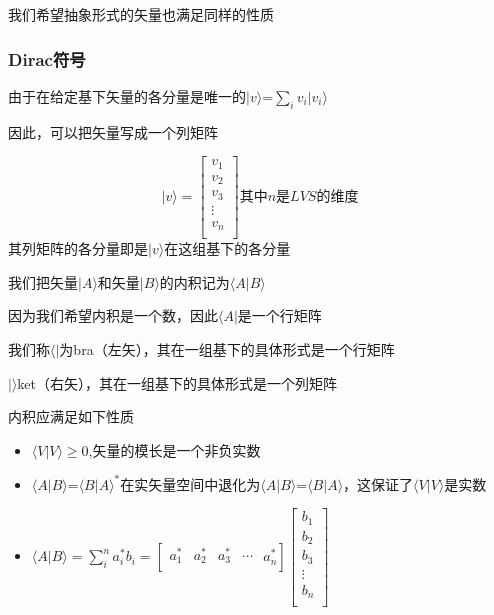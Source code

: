 \documentclass[lang=cn,10pt]{elegantbook}
\begin{document}
我们希望抽象形式的矢量也满足同样的性质

\subsubsection{Dirac符号}
由于在给定基下矢量的各分量是唯一的$|v\rangle$=$\sum_{i}v_i|v_i\rangle$

因此，可以把矢量写成一个列矩阵

\begin{equation}
	|v\rangle =\left[ \begin{array}{c}
		v_1\\
		v_2\\
		v_3\\
		\vdots\\
		v_n\\
	\end{array} \right] \text{其中}n\text{是}LVS\text{的维度}
\end{equation}
其列矩阵的各分量即是$|v\rangle$在这组基下的各分量

我们把矢量$|A\rangle$和矢量$|B\rangle$的内积记为$\langle A|B\rangle $

因为我们希望内积是一个数，因此$\langle A|$是一个行矩阵

我们称$\langle |$为bra（左矢），其在一组基下的具体形式是一个行矩阵

$|\rangle$ket（右矢），其在一组基下的具体形式是一个列矩阵

内积应满足如下性质
\begin{itemize}
	\item $\langle V|V\rangle \ge 0$,矢量的模长是一个非负实数
	\item $\langle A|B\rangle $=$\langle B|A\rangle^* $在实矢量空间中退化为$\langle A|B\rangle $=$\langle B|A\rangle $，这保证了$\langle V|V\rangle $是实数
	\item $\langle A|B\rangle =\sum_{i}^{n}a^{*}_i b_i=\left[ \begin{matrix}
		a_{1}^{*}&		a_{2}^{*}&		a_{3}^{*}&		\cdots\\
	\end{matrix}\,\,a_{n}^{*} \right] \left[ \begin{array}{c}
		b_1\\
		b_2\\
		b_3\\
		\vdots\\
		b_n\\
	\end{array} \right] $
\end{itemize}
\end{document}
